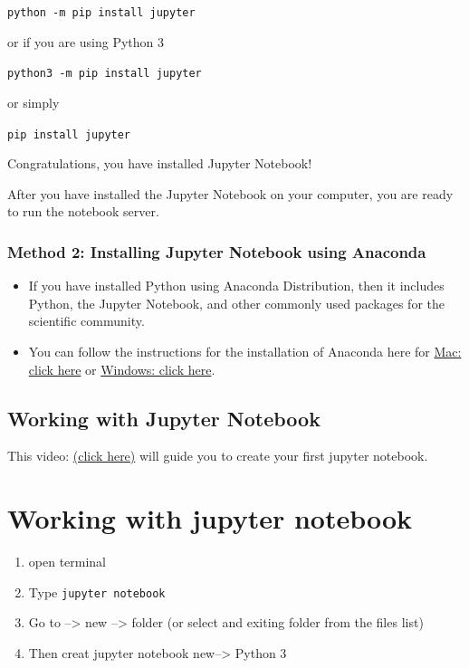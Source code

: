 \documentclass[
]{book}
\providecommand{\tightlist}{%
  \setlength{\itemsep}{0pt}\setlength{\parskip}{0pt}}
\begin{document}
\texttt{python\ -m\ pip\ install\ jupyter}

or if you are using Python 3

\texttt{python3\ -m\ pip\ install\ jupyter}

or simply

\texttt{pip\ install\ jupyter}

Congratulations, you have installed Jupyter Notebook!

After you have installed the Jupyter Notebook on your computer, you are ready to run the notebook server.

\hypertarget{method-2-installing-jupyter-notebook-using-anaconda}{%
\subsection{Method 2: Installing Jupyter Notebook using Anaconda}\label{method-2-installing-jupyter-notebook-using-anaconda}}

\begin{itemize}
\item
  If you have installed Python using Anaconda Distribution, then it includes Python, the Jupyter Notebook, and other commonly used packages for the scientific community.
\item
  You can follow the instructions for the installation of Anaconda here for \href{https://www.datacamp.com/community/tutorials/installing-anaconda-mac-os-x}{Mac: click here} or \href{https://www.datacamp.com/community/tutorials/installing-anaconda-windows}{Windows: click here}.
\end{itemize}

\hypertarget{working-with-jupyter-notebook}{%
\section{Working with Jupyter Notebook}\label{working-with-jupyter-notebook}}

This video: \href{https://www.youtube.com/watch?v=IKBMIThz78c}{(click here)} will guide you to create your first jupyter notebook.

\hypertarget{working-with-jupyter-notebook-1}{%
\chapter{Working with jupyter notebook}\label{working-with-jupyter-notebook-1}}

\begin{enumerate}
\def\labelenumi{\arabic{enumi}.}
\tightlist
\item
  open terminal
\item
  Type \texttt{jupyter\ notebook}
\item
  Go to --\textgreater{} new --\textgreater{} folder (or select and exiting folder from the files list)
\item
  Then creat jupyter notebook
  new--\textgreater{} Python 3
\end{enumerate}
\end{document}
